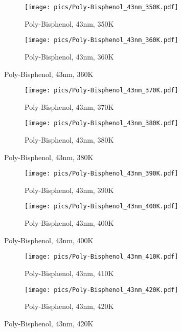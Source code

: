 \begin{figure}[!htb]
\centering
\begin{subfigure}[t]{.5\textwidth}
  \centering
  \texttt{[image: pics/Poly-Bisphenol\_43nm\_350K.pdf]}
  \caption{Poly-Bisphenol, 43nm, 350K}
  \label{fig:sub25}
\end{subfigure}%
\begin{subfigure}[t]{.5\textwidth}
  \centering
  \texttt{[image: pics/Poly-Bisphenol\_43nm\_360K.pdf]}
  \caption{Poly-Bisphenol, 43nm, 360K}
  \label{fig:sub26}
\end{subfigure}%
\end{figure}

\begin{figure}[!htb]
\centering
\begin{subfigure}[t]{.5\textwidth}
  \centering
  \texttt{[image: pics/Poly-Bisphenol\_43nm\_370K.pdf]}
  \caption{Poly-Bisphenol, 43nm, 370K}
  \label{fig:sub27}
\end{subfigure}%
\begin{subfigure}[t]{.5\textwidth}
  \centering
  \texttt{[image: pics/Poly-Bisphenol\_43nm\_380K.pdf]}
  \caption{Poly-Bisphenol, 43nm, 380K}
  \label{fig:sub28}
\end{subfigure}%
\end{figure}

\begin{figure}[!htb]
\centering
\begin{subfigure}[t]{.5\textwidth}
  \centering
  \texttt{[image: pics/Poly-Bisphenol\_43nm\_390K.pdf]}
  \caption{Poly-Bisphenol, 43nm, 390K}
  \label{fig:sub29}
\end{subfigure}%
\begin{subfigure}[t]{.5\textwidth}
  \centering
  \texttt{[image: pics/Poly-Bisphenol\_43nm\_400K.pdf]}
  \caption{Poly-Bisphenol, 43nm, 400K}
  \label{fig:sub30}
\end{subfigure}%
\end{figure}

\begin{figure}[!htb]
\centering
\begin{subfigure}[t]{.5\textwidth}
  \centering
  \texttt{[image: pics/Poly-Bisphenol\_43nm\_410K.pdf]}
  \caption{Poly-Bisphenol, 43nm, 410K}
  \label{fig:sub31}
\end{subfigure}%
\begin{subfigure}[t]{.5\textwidth}
  \centering
  \texttt{[image: pics/Poly-Bisphenol\_43nm\_420K.pdf]}
  \caption{Poly-Bisphenol, 43nm, 420K}
  \label{fig:sub32}
\end{subfigure}%
\end{figure}

